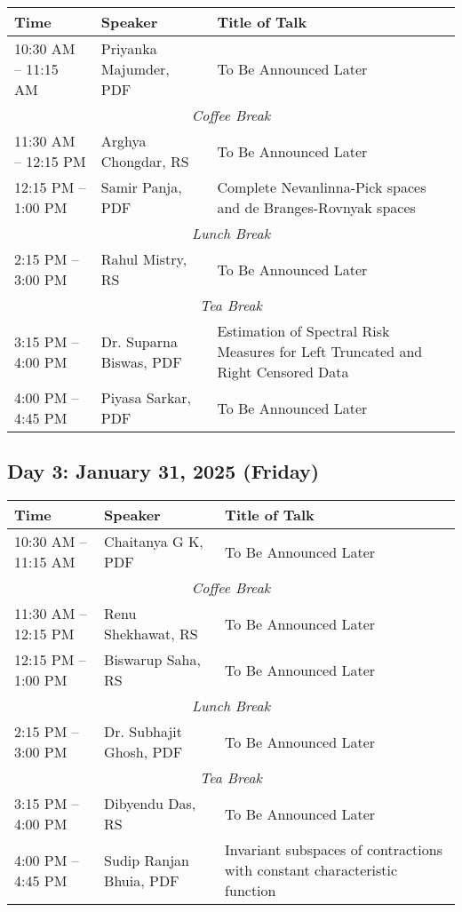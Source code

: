 \noindent
\renewcommand{\arraystretch}{1.5} %
\begin{tabular}{|p{3.5cm}|p{4cm}|p{7cm}|}
	\hline
	\textbf{Time} & \textbf{Speaker} & \textbf{Title of Talk} \\
	\hline
	10:30 AM -- 11:15 AM & Priyanka Majumder, PDF & To Be Announced Later \\
	\hline
	\multicolumn{3}{|c|}{\textit{Coffee Break}} \\
	\hline
	11:30 AM -- 12:15 PM & Arghya Chongdar, RS & To Be Announced Later \\
	\hline
	12:15 PM -- 1:00 PM & Samir Panja, PDF & Complete Nevanlinna-Pick spaces and de Branges-Rovnyak spaces \\
	\hline
	\multicolumn{3}{|c|}{\textit{Lunch Break}} \\
	\hline
	2:15 PM -- 3:00 PM & Rahul Mistry, RS & To Be Announced Later \\
	\hline
	\multicolumn{3}{|c|}{\textit{Tea Break}} \\
	\hline
	3:15 PM -- 4:00 PM & Dr. Suparna Biswas, PDF &  Estimation of Spectral Risk Measures for Left Truncated and Right Censored Data  \\
	\hline
	4:00 PM -- 4:45 PM & Piyasa Sarkar, PDF & To Be Announced Later \\
	\hline

\end{tabular}

\subsection*{Day 3: January 31, 2025 (Friday)}

\noindent
\renewcommand{\arraystretch}{1.5} %
\begin{tabular}{|p{3.5cm}|p{4cm}|p{7cm}|}
	\hline
	\textbf{Time} & \textbf{Speaker} & \textbf{Title of Talk} \\
	\hline
	10:30 AM -- 11:15 AM & Chaitanya G K, PDF & To Be Announced Later \\
	\hline
	\multicolumn{3}{|c|}{\textit{Coffee Break}} \\
	\hline
	11:30 AM -- 12:15 PM & Renu Shekhawat, RS & To Be Announced Later \\
	\hline
	12:15 PM -- 1:00 PM & Biswarup Saha, RS & To Be Announced Later \\
	\hline
	\multicolumn{3}{|c|}{\textit{Lunch Break}} \\
	\hline
	2:15 PM -- 3:00 PM & Dr. Subhajit Ghosh, PDF & To Be Announced Later \\
	\hline
	\multicolumn{3}{|c|}{\textit{Tea Break}} \\
	\hline
	3:15 PM -- 4:00 PM &  Dibyendu Das, RS & To Be Announced Later \\
	\hline

	4:00 PM -- 4:45 PM & Sudip Ranjan Bhuia, PDF & Invariant subspaces of contractions with constant characteristic function \\
	\hline
\end{tabular}
